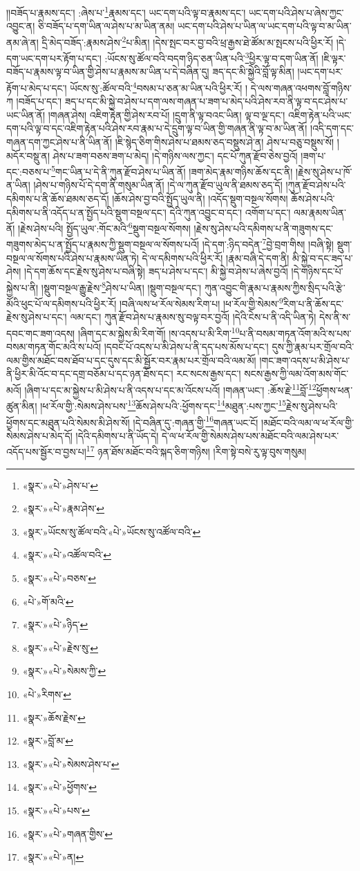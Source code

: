 །།བཟོད་པ་རྣམས་དང་། :ཞེས་པ་\footnote{«སྣར་»«པེ་»ཤེས་པ་}རྣམས་དང་། ཡང་དག་པའི་ལྟ་བ་རྣམས་དང་། ཡང་དག་པའི་ཤེས་པ་ཞེས་ཀྱང་འབྱུང་ན། ཅི་བཟོད་པ་དག་ཡིན་ལ་ཤེས་པ་མ་ཡིན་ནམ། ཡང་དག་པའི་ཤེས་པ་ཡིན་ལ་ཡང་དག་པའི་ལྟ་བ་མ་ཡིན་ནམ་ཞེ་ན། དྲི་མེད་བཟོད་:རྣམས་ཤེས་\footnote{«སྣར་»«པེ་»རྣམ་ཤེས་}པ་མིན། །དེས་སྤང་བར་བྱ་བའི་ཕྲ་རྒྱས་ཐེ་ཚོམ་མ་སྤངས་པའི་ཕྱིར་རོ། །དེ་དག་ཡང་དག་པར་རྟོག་པ་དང་། :ཡོངས་སུ་ཚོལ་བའི་བདག་ཉིད་ཅན་ཡིན་པའི་\footnote{«སྣར་»ཡོངས་སུ་ཚོལ་བའི་«པེ་»ཡོངས་སུ་འཚོལ་བའི་}ཕྱིར་ལྟ་བ་དག་ཡིན་ནོ། །ཇི་ལྟར་བཟོད་པ་རྣམས་ལྟ་བ་ཡིན་གྱི་ཤེས་པ་རྣམས་མ་ཡིན་པ་དེ་བཞིན་དུ། ཟད་དང་མི་སྐྱེའི་བློ་ལྟ་མིན། །ཡང་དག་པར་རྟོག་པ་མེད་པ་དང་། ཡོངས་སུ་:ཚོལ་བའི་\footnote{«སྣར་»«པེ་»འཚོལ་བའི་}བསམ་པ་ཅན་མ་ཡིན་པའི་ཕྱིར་རོ། །
དེ་ལས་གཞན་འཕགས་བློ་གཉིས་ཀ །བཟོད་པ་དང་། ཟད་པ་དང་མི་སྐྱེ་བ་ཤེས་པ་དག་ལས་གཞན་པ་ཟག་པ་མེད་པའི་ཤེས་རབ་ནི་ལྟ་བ་དང་ཤེས་པ་ཡང་ཡིན་ནོ། །གཞན་ཤེས། འཇིག་རྟེན་གྱི་ཤེས་རབ་པོ། །དྲུག་ནི་ལྟ་བའང་ཡིན། ལྟ་བ་ལྔ་དང་། འཇིག་རྟེན་པའི་ཡང་དག་པའི་ལྟ་བ་དང་འཇིག་རྟེན་པའི་ཤེས་རབ་རྣམ་པ་དེ་དྲུག་ལྟ་བ་ཡིན་གྱི་གཞན་ནི་ལྟ་བ་མ་ཡིན་ནོ། །འདི་དག་དང་གཞན་དག་ཀྱང་ཤེས་པ་ནི་ཡིན་ནོ། །ཇི་སྙེད་ཅིག་གིས་ཤེས་པ་ཐམས་ཅད་བསྡུས་ཤེ་ན། ཤེས་པ་བཅུ་བསྡུས་སོ། །མདོར་བསྡུ་ན། ཤེས་པ་ཟག་བཅས་ཟག་པ་མེད། །དེ་གཉིས་ལས་ཀྱང་། དང་པོ་ཀུན་རྫོབ་ཅེས་བྱའོ། །ཟག་པ་དང་:བཅས་པ་\footnote{«སྣར་»«པེ་»བཅས་}གང་ཡིན་པ་དེ་ནི་ཀུན་རྫོབ་ཤེས་པ་ཡིན་ནོ། །ཟག་མེད་རྣམ་གཉིས་ཆོས་དང་ནི། །རྗེས་སུ་ཤེས་པ་ཁོ་ན་ཡིན། །ཤེས་པ་གཉིས་པོ་དེ་དག་ནི་གསུམ་ཡིན་ནོ། །དེ་ལ་ཀུན་རྫོབ་ཡུལ་ནི་ཐམས་ཅད་དོ། །ཀུན་རྫོབ་ཤེས་པའི་དམིགས་པ་ནི་ཆོས་ཐམས་ཅད་དོ། །ཆོས་ཤེས་བྱ་བའི་སྤྱོད་ཡུལ་ནི། །འདོད་སྡུག་བསྔལ་སོགས། ཆོས་ཤེས་པའི་དམིགས་པ་ནི་འདོད་པ་ན་སྤྱོད་པའི་སྡུག་བསྔལ་དང་། དེའི་ཀུན་འབྱུང་བ་དང་། འགོག་པ་དང་། ལམ་རྣམས་ཡིན་ནོ། །རྗེས་ཤེས་པའི། སྤྱོད་ཡུལ་:གོང་མའི་\footnote{«པེ་»གོ་མའི་}སྡུག་བསྔལ་སོགས། །རྗེས་སུ་ཤེས་པའི་དམིགས་པ་ནི་གཟུགས་དང་གཟུགས་མེད་པ་ན་སྤྱོད་པ་རྣམས་ཀྱི་སྡུག་བསྔལ་ལ་སོགས་པའོ། །དེ་དག་:ཉིད་བདེན་\footnote{«སྣར་»«པེ་»ཉིད་}བྱེ་བྲག་གིས། །བཞི་སྟེ། སྡུག་བསྔལ་ལ་སོགས་པའི་ཤེས་པ་རྣམས་ཡིན་ཏེ། དེ་ལ་དམིགས་པའི་ཕྱིར་རོ། །རྣམ་བཞི་དེ་དག་ནི། མི་སྐྱེ་བ་དང་ཟད་པ་ཤེས། །དེ་དག་ཆོས་དང་རྗེས་སུ་ཤེས་པ་བཞི་སྟེ། ཟད་པ་ཤེས་པ་དང་། མི་སྐྱེ་བ་ཤེས་པ་ཞེས་བྱའོ། །དེ་གཉིས་དང་པོ་སྐྱེས་པ་ནི། །སྡུག་བསྔལ་རྒྱུ་རྗེས་\footnote{«སྣར་»«པེ་»རྗེས་སུ་}ཤེས་པ་ཡིན། །སྡུག་བསྔལ་དང་། ཀུན་འབྱུང་གི་རྣམ་པ་རྣམས་ཀྱིས་སྲིད་པའི་རྩེ་མོའི་ཕུང་པོ་ལ་དམིགས་པའི་ཕྱིར་རོ། །བཞི་ལས་ཕ་རོལ་སེམས་རིག་པ། །ཕ་རོལ་གྱི་སེམས་\footnote{«སྣར་»«པེ་»སེམས་ཀྱི་}རིག་པ་ནི་ཆོས་དང་རྗེས་སུ་ཤེས་པ་དང་། ལམ་དང་། ཀུན་རྫོབ་ཤེས་པ་རྣམས་སུ་བལྟ་བར་བྱའོ། །དེའི་ངེས་པ་ནི་འདི་ཡིན་ཏེ། དེས་ནི་ས་དབང་གང་ཟག་འདས། །ཞིག་དང་མ་སྐྱེས་མི་རིག་གོ། །ས་འདས་པ་མི་རིག་\footnote{«པེ་»རིགས་}པ་ནི་བསམ་གཏན་འོག་མའི་ས་པས་བསམ་གཏན་གོང་མའི་ས་པའོ། །དབང་པོ་འདས་པ་མི་ཤེས་པ་ནི་དད་པས་མོས་པ་དང་། དུས་ཀྱི་རྣམ་པར་གྲོལ་བའི་ལམ་གྱིས་མཐོང་བས་ཐོབ་པ་དང་དུས་དང་མི་སྦྱོར་བར་རྣམ་པར་གྲོལ་བའི་ལམ་མོ། །གང་ཟག་འདས་པ་མི་ཤེས་པ་ནི་ཕྱིར་མི་འོང་བ་དང་དགྲ་བཅོམ་པ་དང་ཉན་ཐོས་དང་། རང་སངས་རྒྱས་དང་། སངས་རྒྱས་ཀྱི་ལམ་འོག་མས་གོང་མའོ། །ཞིག་པ་དང་མ་སྐྱེས་པ་མི་ཤེས་པ་ནི་འདས་པ་དང་མ་འོངས་པའོ། །གཞན་ཡང་། :ཆོས་རྗེ་\footnote{«སྣར་»ཆོས་རྗེས་}བློ་\footnote{«སྣར་»བློ་མ་}ཕྱོགས་ཕན་ཚུན་མིན། །ཕ་རོལ་གྱི་:སེམས་ཤེས་པས་\footnote{«སྣར་»«པེ་»སེམས་ཤེས་པ་}ཆོས་ཤེས་པའི་:ཕྱོགས་དང་\footnote{«སྣར་»«པེ་»ཕྱོགས་}མཐུན་:པས་ཀྱང་\footnote{«སྣར་»«པེ་»པས་}རྗེས་སུ་ཤེས་པའི་ཕྱོགས་དང་མཐུན་པའི་སེམས་མི་ཤེས་སོ། །དེ་བཞིན་དུ་:གཞན་གྱི་\footnote{«སྣར་»«པེ་»གཞན་གྱིས་}གཞན་ཡང་ངོ། །མཐོང་བའི་ལམ་ལ་ཕ་རོལ་གྱི་སེམས་ཤེས་པ་མེད་དོ། །དེའི་དམིགས་པ་ནི་ཡོད་དེ། དེ་ལ་ཕ་རོལ་གྱི་སེམས་ཤེས་པས་མཐོང་བའི་ལམ་ཤེས་པར་འདོད་པས་སྦྱོར་བ་བྱས་པ།\footnote{«སྣར་»«པེ་»ན།} ཉན་ཐོས་མཐོང་བའི་སྐད་ཅིག་གཉིས། །རིག་སྟེ་བསེ་རུ་ལྟ་བུས་གསུམ། 